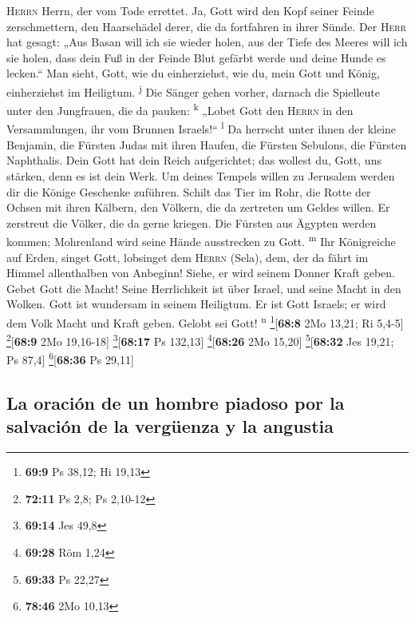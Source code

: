 \textsc{Herrn} Herrn, der vom Tode errettet.  Ja, Gott
wird den Kopf seiner Feinde zerschmettern, den Haarschädel derer, die da
fortfahren in ihrer Sünde.  Der \textsc{Herr} hat gesagt:
„Aus Basan will ich sie wieder holen, aus der Tiefe des Meeres will ich
sie holen,  dass dein Fuß in der Feinde Blut gefärbt
werde und deine Hunde es lecken.``  Man sieht, Gott, wie
du einherziehst, wie du, mein Gott und König, einherziehst im Heiligtum.
\textsuperscript{j}  Die Sänger gehen vorher, darnach die
Spielleute unter den Jungfrauen, die da pauken: \textsuperscript{k}
 „Lobet Gott den \textsc{Herrn} in den Versammlungen, ihr
vom Brunnen Israels!{}`` \textsuperscript{l}  Da herrscht
unter ihnen der kleine Benjamin, die Fürsten Judas mit ihren Haufen, die
Fürsten Sebulons, die Fürsten Naphthalis.  Dein Gott hat
dein Reich aufgerichtet; das wollest du, Gott, uns stärken, denn es ist
dein Werk.  Um deines Tempels willen zu Jerusalem werden
dir die Könige Geschenke zuführen.  Schilt das Tier im
Rohr, die Rotte der Ochsen mit ihren Kälbern, den Völkern, die da
zertreten um Geldes willen. Er zerstreut die Völker, die da gerne
kriegen.  Die Fürsten aus Ägypten werden kommen;
Mohrenland wird seine Hände ausstrecken zu Gott. \textsuperscript{m}
 Ihr Königreiche auf Erden, singet Gott, lobsinget dem
\textsc{Herrn} (Sela),  dem, der da fährt im Himmel
allenthalben von Anbeginn! Siehe, er wird seinem Donner Kraft geben.
 Gebet Gott die Macht! Seine Herrlichkeit ist über
Israel, und seine Macht in den Wolken.  Gott ist
wundersam in seinem Heiligtum. Er ist Gott Israels; er wird dem Volk
Macht und Kraft geben. Gelobt sei Gott! \textsuperscript{n}
\footnote{\textbf{69:9} Ps 38,12; Hi 19,13}{[}\textbf{68:8} 2Mo 13,21;
Ri 5,4-5{]} \footnote{\textbf{72:11} Ps 2,8; Ps 2,10-12}{[}\textbf{68:9}
2Mo 19,16-18{]} \footnote{\textbf{69:14} Jes 49,8}{[}\textbf{68:17} Ps
132,13{]} \footnote{\textbf{69:28} Röm 1,24}{[}\textbf{68:26} 2Mo
15,20{]} \footnote{\textbf{69:33} Ps 22,27}{[}\textbf{68:32} Jes 19,21;
Ps 87,4{]} \footnote{\textbf{78:46} 2Mo 10,13}{[}\textbf{68:36} Ps
29,11{]}

\hypertarget{la-oraciuxf3n-de-un-hombre-piadoso-por-la-salvaciuxf3n-de-la-verguxfcenza-y-la-angustia}{%
\subsection{La oración de un hombre piadoso por la salvación de la
vergüenza y la
angustia}\label{la-oraciuxf3n-de-un-hombre-piadoso-por-la-salvaciuxf3n-de-la-verguxfcenza-y-la-angustia}}

